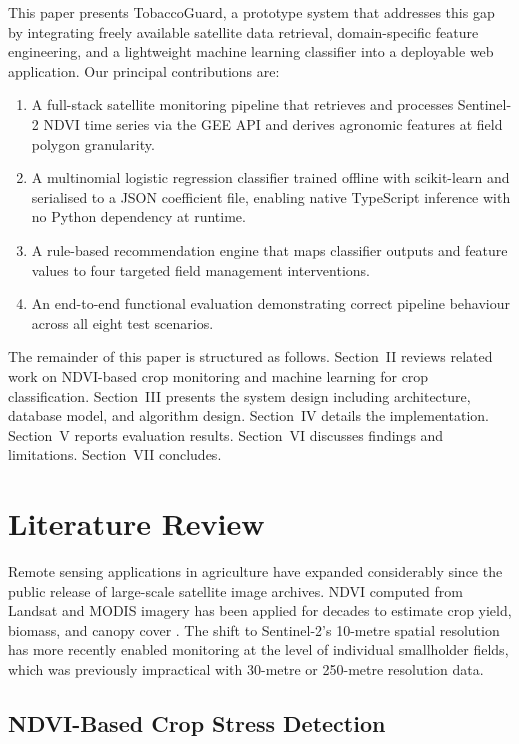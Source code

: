 \documentclass[conference]{IEEEtran}
\begin{document}
This paper presents TobaccoGuard, a prototype system that addresses this
gap by integrating freely available satellite data retrieval,
domain-specific feature engineering, and a lightweight machine learning
classifier into a deployable web application. Our principal contributions
are:
\begin{enumerate}
  \item A full-stack satellite monitoring pipeline that retrieves and
    processes Sentinel-2 NDVI time series via the GEE API and derives
    agronomic features at field polygon granularity.
  \item A multinomial logistic regression classifier trained offline
    with scikit-learn and serialised to a JSON coefficient file, enabling
    native TypeScript inference with no Python dependency at runtime.
  \item A rule-based recommendation engine that maps classifier outputs
    and feature values to four targeted field management interventions.
  \item An end-to-end functional evaluation demonstrating correct
    pipeline behaviour across all eight test scenarios.
\end{enumerate}

The remainder of this paper is structured as follows. Section~II reviews
related work on NDVI-based crop monitoring and machine learning for
crop classification. Section~III presents the system design including
architecture, database model, and algorithm design. Section~IV details
the implementation. Section~V reports evaluation results. Section~VI
discusses findings and limitations. Section~VII concludes.

\section{Literature Review}

Remote sensing applications in agriculture have expanded considerably
since the public release of large-scale satellite image archives. NDVI
computed from Landsat and MODIS imagery has been applied for decades to
estimate crop yield, biomass, and canopy cover \cite{xue2017}. The shift
to Sentinel-2's 10-metre spatial resolution has more recently enabled
monitoring at the level of individual smallholder fields, which was
previously impractical with 30-metre or 250-metre resolution data.

\subsection{NDVI-Based Crop Stress Detection}
\end{document}
